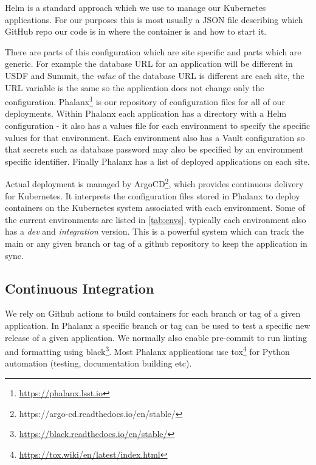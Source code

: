 Helm is a standard approach which we use to manage our Kubernetes applications.
For our purposes this is most usually a JSON file describing which GitHub repo our code is in where the container is and how to start it.

There are parts of this configuration which are site specific and parts which are generic.
For example the database URL for an application will be different in USDF and Summit, the \emph{value} of the database URL is different are each site, the URL variable is the same so the application does not change only the configuration.
Phalanx\footnote{\url{https://phalanx.lsst.io}} is our repository of configuration files for all of our deployments.
Within Phalanx each application has a directory with a Helm configuration - it also has a values file for each environment to specify the specific values for that environment.
Each environment also has a Vault configuration so that secrets such as database password may also be specified by an environment specific identifier.
Finally Phalanx has a list of deployed applications on each site.

Actual deployment is managed by ArgoCD\footnote{https://argo-cd.readthedocs.io/en/stable/}, which provides continuous delivery for Kubernetes.
It interprets the configuration files stored in Phalanx to deploy containers on the Kubernetes system associated with each environment.
Some of the current environments are listed in \autoref{tab:envs}, typically each environment also has a \emph{dev} and \emph{integration} version.
This is a powerful system which can track the main or any given branch or tag of a github repository to keep the application in sync.


\subsection{Continuous Integration}
We rely on Github actions to build containers for each branch or tag of a given application.
In Phalanx a specific branch or tag can be used to test a specific new release of a given application.
We normally also enable pre-commit to run linting and formatting using black\footnote{\url{https://black.readthedocs.io/en/stable/}}.
Most Phalanx applications use tox\footnote{\url{https://tox.wiki/en/latest/index.html}} for Python automation (testing, documentation building etc).

